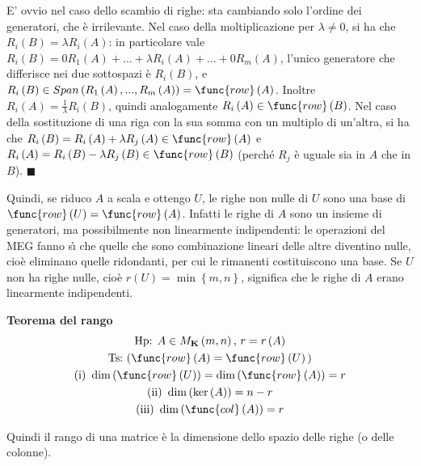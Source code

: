 \documentclass{article}
\begin{document}
E' ovvio nel caso dello scambio di righe: sta cambiando solo l'ordine dei
generatori, che \`{e} irrilevante. Nel caso della moltiplicazione per $%
\lambda \neq 0$, si ha che $R_{i}\left( B\right) =\lambda R_{i}\left(
A\right) $: in particolare vale $R_{i}\left( B\right) =0R_{1}\left( A\right)
+...+\lambda R_{i}\left( A\right) +...+0R_{m}\left( A\right) $, l'unico
generatore che differisce nei due sottospazi \`{e} $R_{i}\left( B\right) $,
e $R_{i}\left( B\right) \in Span\left( R_{1}\left( A\right) ,...,R_{m}\left(
A\right) \right) =\func{row}\left( A\right) $. Inoltre $R_{i}\left( A\right)
=\frac{1}{\lambda }R_{i}\left( B\right) $, quindi analogamente $R_{i}\left(
A\right) \in \func{row}\left( B\right) $. Nel caso della sostituzione di una
riga con la sua somma con un multiplo di un'altra, si ha che $R_{i}\left(
B\right) =R_{i}\left( A\right) +\lambda R_{j}\left( A\right) \in \func{row}%
\left( A\right) $ e $R_{i}\left( A\right) =R_{i}\left( B\right) -\lambda
R_{j}\left( B\right) \in \func{row}\left( B\right) $ (perch\'{e} $R_{j}$ 
\`{e} uguale sia in $A$ che in $B$). $\blacksquare $

Quindi, se riduco $A$ a scala e ottengo $U$, le righe non nulle di $U$ sono
una base di $\func{row}\left( U\right) =\func{row}\left( A\right) $. Infatti
le righe di $A$ sono un insieme di generatori, ma possibilmente non
linearmente indipendenti: le operazioni del MEG fanno s\`{\i} che quelle che
sono combinazione lineari delle altre diventino nulle, cio\`{e} eliminano
quelle ridondanti, per cui le rimanenti costituiscono una base. Se $U$ non
ha righe nulle, cio\`{e} $r\left( U\right) =\min \left\{ m,n\right\} $,
significa che le righe di $A$ erano linearmente indipendenti.

\textbf{Teorema del rango}%
\begin{gather*}
\text{Hp}\text{: }A\in M_{\mathbf{K}}\left( m,n\right) \text{, }r=r\left(
A\right) \\
\text{Ts}\text{:}\text{ (}\func{row}\left( A\right) =\func{row}\left(
U\right) \text{)} \\
\text{(i) }\dim \left( \func{row}\left( U\right) \right) =\dim \left( \func{%
row}\left( A\right) \right) =r \\
\text{(ii) }\dim \left( \ker \left( A\right) \right) =n-r \\
\text{(iii) }\dim \left( \func{col}\left( A\right) \right) =r
\end{gather*}

Quindi il rango di una matrice \`{e} la dimensione dello spazio delle righe
(o delle colonne).
\end{document}
